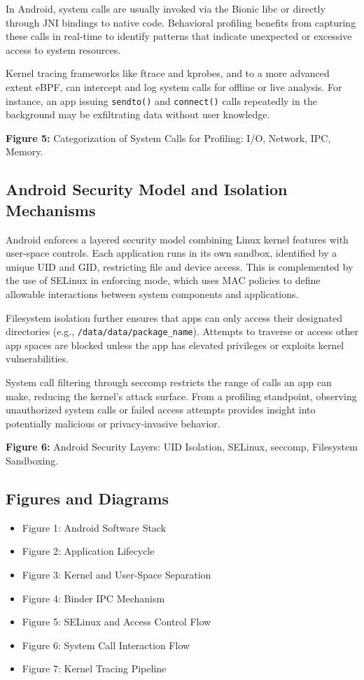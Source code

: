 \documentclass[a4paper,12pt]{report}
\begin{document}
In Android, system calls are usually invoked via the Bionic libc or directly through JNI bindings to native code. Behavioral profiling benefits from capturing these calls in real-time to identify patterns that indicate unexpected or excessive access to system resources.

Kernel tracing frameworks like ftrace and kprobes, and to a more advanced extent eBPF, can intercept and log system calls for offline or live analysis. For instance, an app issuing \texttt{sendto()} and \texttt{connect()} calls repeatedly in the background may be exfiltrating data without user knowledge.

\textbf{Figure 5:} Categorization of System Calls for Profiling: I/O, Network, IPC, Memory.

\subsection{ Android Security Model and Isolation Mechanisms}
Android enforces a layered security model combining Linux kernel features with user-space controls. Each application runs in its own sandbox, identified by a unique UID and GID, restricting file and device access. This is complemented by the use of SELinux in enforcing mode, which uses MAC policies to define allowable interactions between system components and applications.

Filesystem isolation further ensures that apps can only access their designated directories (e.g., \texttt{/data/data/{package\_name}}). Attempts to traverse or access other app spaces are blocked unless the app has elevated privileges or exploits kernel vulnerabilities.

System call filtering through seccomp restricts the range of calls an app can make, reducing the kernel's attack surface. From a profiling standpoint, observing unauthorized system calls or failed access attempts provides insight into potentially malicious or privacy-invasive behavior.

\textbf{Figure 6:} Android Security Layers: UID Isolation, SELinux, seccomp, Filesystem Sandboxing.

\subsection*{Figures and Diagrams}
\begin{itemize}
\item Figure 1: Android Software Stack
\item Figure 2: Application Lifecycle
\item Figure 3: Kernel and User-Space Separation
\item Figure 4: Binder IPC Mechanism
\item Figure 5: SELinux and Access Control Flow
\item Figure 6: System Call Interaction Flow
\item Figure 7: Kernel Tracing Pipeline
\end{itemize}
\end{document}
